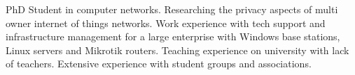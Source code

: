 


PhD Student in computer networks.
Researching the privacy aspects of multi owner internet of things networks.
Work experience with tech support and infrastructure management for a large enterprise with Windows base stations, Linux servers and Mikrotik routers.
Teaching experience on university with lack of teachers.
Extensive experience with student groups and associations.

